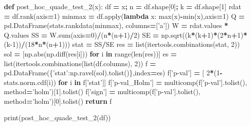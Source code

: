 \documentclass[polish,]{book}
\newenvironment{Shaded}{\begin{snugshade}}{\end{snugshade}}
\newcommand{\BuiltInTok}[1]{#1}
\newcommand{\ControlFlowTok}[1]{\textcolor[rgb]{0.13,0.29,0.53}{\textbf{#1}}}
\newcommand{\DecValTok}[1]{\textcolor[rgb]{0.00,0.00,0.81}{#1}}
\newcommand{\KeywordTok}[1]{\textcolor[rgb]{0.13,0.29,0.53}{\textbf{#1}}}
\newcommand{\NormalTok}[1]{#1}
\newcommand{\OperatorTok}[1]{\textcolor[rgb]{0.81,0.36,0.00}{\textbf{#1}}}
\newcommand{\StringTok}[1]{\textcolor[rgb]{0.31,0.60,0.02}{#1}}
\begin{document}
\begin{Shaded}
\begin{Highlighting}[]
\KeywordTok{def}\NormalTok{ post_hoc_quade_test_2(x):}
\NormalTok{    df }\OperatorTok{=}\NormalTok{ x}\OperatorTok{;}\NormalTok{ n }\OperatorTok{=}\NormalTok{ df.shape[}\DecValTok{0}\NormalTok{]}\OperatorTok{;}\NormalTok{ k }\OperatorTok{=}\NormalTok{ df.shape[}\DecValTok{1}\NormalTok{]}
\NormalTok{    rdat }\OperatorTok{=}\NormalTok{ df.rank(axis}\OperatorTok{=}\DecValTok{1}\NormalTok{)}
\NormalTok{    minmax }\OperatorTok{=}\NormalTok{ df.}\BuiltInTok{apply}\NormalTok{(}\KeywordTok{lambda}\NormalTok{ x: }\BuiltInTok{max}\NormalTok{(x)}\OperatorTok{-}\BuiltInTok{min}\NormalTok{(x),axis}\OperatorTok{=}\DecValTok{1}\NormalTok{)}
\NormalTok{    Q }\OperatorTok{=}\NormalTok{ pd.DataFrame(stats.rankdata(minmax), columns}\OperatorTok{=}\NormalTok{[}\StringTok{'a'}\NormalTok{])}
\NormalTok{    W }\OperatorTok{=}\NormalTok{ rdat.values }\OperatorTok{*}\NormalTok{ Q.values}
\NormalTok{    SS }\OperatorTok{=}\NormalTok{ W.}\BuiltInTok{sum}\NormalTok{(axis}\OperatorTok{=}\DecValTok{0}\NormalTok{)}\OperatorTok{/}\NormalTok{(n}\OperatorTok{*}\NormalTok{(n}\OperatorTok{+}\DecValTok{1}\NormalTok{)}\OperatorTok{/}\DecValTok{2}\NormalTok{)}
\NormalTok{    SE }\OperatorTok{=}\NormalTok{ np.sqrt((k}\OperatorTok{*}\NormalTok{(k}\OperatorTok{+}\DecValTok{1}\NormalTok{)}\OperatorTok{*}\NormalTok{(}\DecValTok{2}\OperatorTok{*}\NormalTok{n}\OperatorTok{+}\DecValTok{1}\NormalTok{)}\OperatorTok{*}\NormalTok{(k}\DecValTok{-1}\NormalTok{))}\OperatorTok{/}\NormalTok{(}\DecValTok{18}\OperatorTok{*}\NormalTok{n}\OperatorTok{*}\NormalTok{(n}\OperatorTok{+}\DecValTok{1}\NormalTok{)))}
\NormalTok{    stat }\OperatorTok{=}\NormalTok{ SS}\OperatorTok{/}\NormalTok{SE}
\NormalTok{    res }\OperatorTok{=} \BuiltInTok{list}\NormalTok{(itertools.combinations(stat, }\DecValTok{2}\NormalTok{))}
\NormalTok{    sol }\OperatorTok{=}\NormalTok{ [np.}\BuiltInTok{abs}\NormalTok{(np.diff(res[i])) }\ControlFlowTok{for}\NormalTok{ i }\KeywordTok{in} \BuiltInTok{range}\NormalTok{(}\BuiltInTok{len}\NormalTok{(res))]}
\NormalTok{    es }\OperatorTok{=} \BuiltInTok{list}\NormalTok{(itertools.combinations(}\BuiltInTok{list}\NormalTok{(df.columns), }\DecValTok{2}\NormalTok{))}
\NormalTok{    f }\OperatorTok{=}\NormalTok{ pd.DataFrame(\{}\StringTok{'stat'}\NormalTok{:np.ravel(sol).tolist()\},index}\OperatorTok{=}\NormalTok{es)}
\NormalTok{    f[}\StringTok{'p-val'}\NormalTok{] }\OperatorTok{=}\NormalTok{ [ }\DecValTok{2}\OperatorTok{*}\NormalTok{(}\DecValTok{1}\OperatorTok{-}\NormalTok{stats.norm.cdf(i)) }\ControlFlowTok{for}\NormalTok{ i }\KeywordTok{in}\NormalTok{ f[}\StringTok{'stat'}\NormalTok{]]}
\NormalTok{    f[}\StringTok{'p-val_Holm'}\NormalTok{] }\OperatorTok{=}\NormalTok{ multicomp(f[}\StringTok{'p-val'}\NormalTok{].tolist(), method}\OperatorTok{=}\StringTok{'holm'}\NormalTok{)[}\DecValTok{1}\NormalTok{].tolist()}
\NormalTok{    f[}\StringTok{'sign'}\NormalTok{] }\OperatorTok{=}\NormalTok{ multicomp(f[}\StringTok{'p-val'}\NormalTok{].tolist(), method}\OperatorTok{=}\StringTok{'holm'}\NormalTok{)[}\DecValTok{0}\NormalTok{].tolist()}
    \ControlFlowTok{return}\NormalTok{ f}
    
\BuiltInTok{print}\NormalTok{(post_hoc_quade_test_2(df))}
\end{Highlighting}
\end{Shaded}
\end{document}
